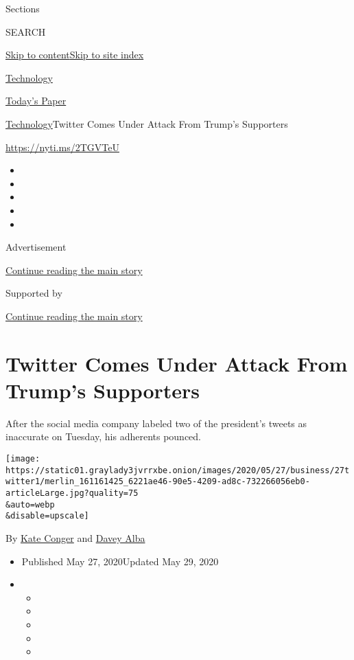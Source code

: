 Sections

SEARCH

\protect\hyperlink{site-content}{Skip to
content}\protect\hyperlink{site-index}{Skip to site index}

\href{https://www.nytimes3xbfgragh.onion/section/technology}{Technology}

\href{https://myaccount.nytimes3xbfgragh.onion/auth/login?response_type=cookie\&client_id=vi}{}

\href{https://www.nytimes3xbfgragh.onion/section/todayspaper}{Today's
Paper}

\href{/section/technology}{Technology}\textbar{}Twitter Comes Under
Attack From Trump's Supporters

\url{https://nyti.ms/2TGVTeU}

\begin{itemize}
\item
\item
\item
\item
\item
\end{itemize}

Advertisement

\protect\hyperlink{after-top}{Continue reading the main story}

Supported by

\protect\hyperlink{after-sponsor}{Continue reading the main story}

\hypertarget{twitter-comes-under-attack-from-trumps-supporters}{%
\section{Twitter Comes Under Attack From Trump's
Supporters}\label{twitter-comes-under-attack-from-trumps-supporters}}

After the social media company labeled two of the president's tweets as
inaccurate on Tuesday, his adherents pounced.

\texttt{[image: https://static01.graylady3jvrrxbe.onion/images/2020/05/27/business/27twitter1/merlin\_161161425\_6221ae46-90e5-4209-ad8c-732266056eb0-articleLarge.jpg?quality=75\\\&auto=webp\\\&disable=upscale]}

By \href{https://www.nytimes3xbfgragh.onion/by/kate-conger}{Kate Conger}
and \href{https://www.nytimes3xbfgragh.onion/by/davey-alba}{Davey Alba}

\begin{itemize}
\item
  Published May 27, 2020Updated May 29, 2020
\item
  \begin{itemize}
  \item
  \item
  \item
  \item
  \item
  \end{itemize}
\end{itemize}

